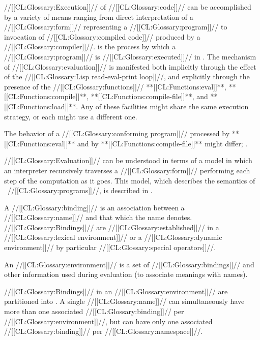 

//[[CL:Glossary:Execution]]// of //[[CL:Glossary:code]]// can be accomplished by a variety of means ranging from direct interpretation of a //[[CL:Glossary:form]]// representing a //[[CL:Glossary:program]]// to invocation of //[[CL:Glossary:compiled code]]// produced by a //[[CL:Glossary:compiler]]//.
   is the process by which a //[[CL:Glossary:program]]// is //[[CL:Glossary:executed]]// in \clisp. The mechanism of //[[CL:Glossary:evaluation]]// is manifested
 both implicitly through the effect of the //[[CL:Glossary:Lisp read-eval-print loop]]//,
 and  explicitly through the presence of the //[[CL:Glossary:functions]]// 
       **[[CL:Functions:eval]]**,
       **[[CL:Functions:compile]]**,
       **[[CL:Functions:compile-file]]**,
   and **[[CL:Functions:load]]**. Any of these facilities might share the same execution strategy,  or each might use a different one.

The behavior of a //[[CL:Glossary:conforming program]]// processed by **[[CL:Functions:eval]]** and by **[[CL:Functions:compile-file]]** might differ; \seesection\SemanticConstraints.

//[[CL:Glossary:Evaluation]]// can be understood in terms of a model in which an interpreter recursively traverses a //[[CL:Glossary:form]]// performing each step of the computation as it goes.   This model, which describes the semantics of \clisp\ //[[CL:Glossary:programs]]//, is described in \secref\EvaluationModel.

 

A //[[CL:Glossary:binding]]// is an association between a //[[CL:Glossary:name]]// and that which the name denotes.  //[[CL:Glossary:Bindings]]// are //[[CL:Glossary:established]]// in a //[[CL:Glossary:lexical environment]]// or a //[[CL:Glossary:dynamic environment]]// by particular //[[CL:Glossary:special operators]]//.

An //[[CL:Glossary:environment]]// is a set of //[[CL:Glossary:bindings]]// and other information used during evaluation (\eg to associate meanings with names).

//[[CL:Glossary:Bindings]]// in an //[[CL:Glossary:environment]]// are partitioned into . A single //[[CL:Glossary:name]]// can simultaneously have more than one associated //[[CL:Glossary:binding]]// per //[[CL:Glossary:environment]]//, but can have only one associated //[[CL:Glossary:binding]]// per //[[CL:Glossary:namespace]]//.

